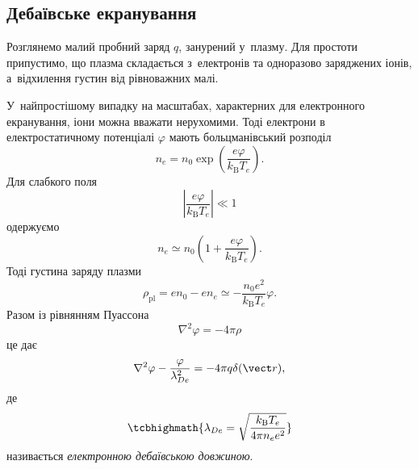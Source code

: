 \subsection{Дебаївське екранування}



Розглянемо малий пробний заряд $q$, занурений у~плазму. Для простоти припустимо, що плазма складається з~електронів та одноразово заряджених іонів, а~відхилення густин від рівноважних малі.

У~найпростішому випадку на масштабах, характерних для електронного екранування, іони можна вважати нерухомими. Тоді електрони в електростатичному потенціалі $\varphi$ мають больцманівський розподіл
\begin{equation}
	n_e=n_0\exp\left(\frac{e\varphi}{k_{\mathrm B}T_e}\right).
\end{equation}
Для слабкого поля
\begin{equation*}
	\left|\frac{e\varphi}{k_{\mathrm B}T_e}\right|\ll1
\end{equation*}
одержуємо
\begin{equation}
	n_e\simeq n_0
	\left(1+\frac{e\varphi}{k_{\mathrm B}T_e}\right).
\end{equation}
Тоді густина заряду плазми
\begin{equation}
	\rho_{\mathrm{pl}}
	=e n_0-e n_e
	\simeq-\frac{n_0e^2}{k_{\mathrm B}T_e}\varphi.
\end{equation}
Разом із рівнянням Пуассона
\begin{equation}
	\nabla^2\varphi=-4\pi\rho
\end{equation}
це дає
\begin{equation}
	\nabla^2\varphi-\frac{\varphi}{\lambda_{De}^2}
	=-4\pi q\delta(\vect r),
\end{equation}
де
\begin{equation}
	\tcbhighmath{\lambda_{De}
		=\sqrt{\frac{k_{\mathrm B}T_e}{4\pi n_e e^2}}}
\end{equation}
називається \emph{електронною дебаївською довжиною}.

